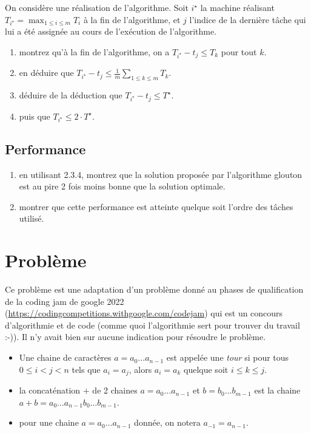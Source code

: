 \documentclass
[12pt]
{article}
\begin{document}
On considère une réalisation de l'algorithme. Soit $i^\star$ la machine réalisant $T_{i^\star} = \max_{1\leq i \leq m} T_i$ à la fin de l'algorithme, et $j$ l'indice de la dernière tâche qui lui a été assignée au cours de l'exécution de l'algorithme.

\begin{enumerate}
    \item montrez qu'à la fin de l'algorithme, on a $T_{i^\star} -t_j \leq T_k$ pour tout $k$.
    \item en déduire que $T_{i ^\star} - t_j \leq \frac{1}{m}\sum_{1\leq k\leq m}T_k$.
    \item déduire de la déduction que $T_{i ^\star} - t_j \leq T^\star$.
    \item puis que $T_{i ^\star} \leq 2 \cdot T^\star$.
\end{enumerate}

\subsection{Performance}

\begin{enumerate}
    \item en utilisant 2.3.4, montrez que la solution proposée par l'algorithme glouton est au pire 2 fois moins bonne que la solution optimale.
    \item montrer que cette performance est atteinte quelque soit l'ordre des tâches utilisé.
\end{enumerate}

\section{Problème}

Ce problème est une adaptation d'un problème donné au phases de qualification de la coding jam de google 2022 (\url{https://codingcompetitions.withgoogle.com/codejam}) qui est un concours d'algorithmie et de code (comme quoi l'algorithmie sert pour trouver du travail :-)). Il n'y avait bien sur aucune indication pour résoudre le problème.

\begin{itemize}
    \item Une chaine de caractères $a=a_0\dots a_{n-1}$ est appelée une {\em tour} si pour tous $0\leq i < j < n$ tels que $a_i = a_j$, alors $a_i = a_k$ quelque soit $i \leq k \leq j$.
    \item la concaténation $+$ de 2 chaines $a=a_0\dots a_{n-1}$ et $b = b_0\dots b_{m-1}$ est la chaine $a+b = a_0\dots a_{n-1}b_0 \dots b_{m-1}$.
    \item pour une chaine $a = a_0\dots a_{n-1}$ donnée, on notera $a_{-1} = a_{n-1}$.
\end{itemize}
\end{document}

